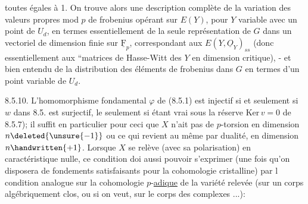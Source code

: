 %
toutes égales à 1\handwritten{)}. On trouve alors une description complète de la variation des valeurs propres mod $p$ de frobenius opérant sur $E(Y)$, pour $Y$ variable avec un point de $U_d$, en termes essentiellement de la seule représentation de $G$ dans un vectoriel de dimension finie sur $\underline{\mathrm F}_p$, correspondant aux $E(Y,\underline O_Y)_{ss}$ (donc essentiellement aux ``matrices de Hasse-Witt des $Y$ en dimension critique), - et bien entendu de la distribution des  éléments de frobenius dans $G$ en termes d'un point variable de $U_d$.

8.5.10. L'homomorphisme \deleted{\unsure{$\varphi$}}fondamental $\varphi$ de (8.5.1) est  injectif\deleted{)}  si et seulement si $w$ dans 8.5. est  surjectif,  le seulement si étant vrai sous la réserve $\mathrm{Ker}\,v=0$ de 8.5.7); il suffit en particulier pour ceci que $X$ n'ait pas de $p$-torsion en  dimension $n\deleted{\unsure{-1}}$  \handwritten{(}ou ce qui revient au même par dualité, en dimension $n\handwritten{+1}$\handwritten{)}. Lorsque $X$ se  relève (avec sa polarisation) en caractéristique nulle, ce condition   doi aussi pouvoir s'exprimer (une fois qu'on disposera de fondements satisfaisants pour la cohomologie cristalline) par l condition analogue sur  la cohomologie $p$-\uline{adique} de la variété relevée (sur un corps algébriquement clos, ou si on veut, sur le corps des complexes ...): 


